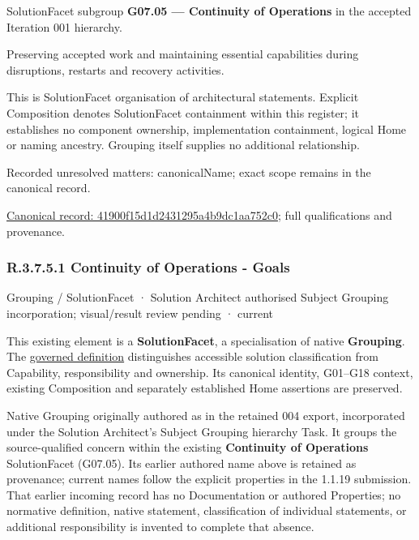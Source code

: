 SolutionFacet subgroup \textbf{G07.05 — Continuity of Operations} in the accepted Iteration 001 hierarchy.



Preserving accepted work and maintaining essential capabilities during disruptions, restarts and recovery activities.



This is SolutionFacet organisation of architectural statements. Explicit Composition denotes SolutionFacet containment within this register; it establishes no component ownership, implementation containment, logical Home or naming ancestry. Grouping itself supplies no additional relationship.


{\small Recorded unresolved matters: canonicalName; exact scope remains in the canonical record.}\par
{\footnotesize \href{../../../../../../../continuum/grouping/41900f15d1d2431295a4b9dc1aa752c0.md}{Canonical record: 41900f15d1d2431295a4b9dc1aa752c0}; full qualifications and provenance.}\par
\subsubsection*{R.3.7.5.1 Continuity of Operations - Goals}
\label{navigation:R.3.7.5.1}

\label{element:a4fbf334ea6e48028e39eb7f74ced2bb}
{\small Grouping / SolutionFacet · Solution Architect authorised Subject Grouping incorporation; visual/result review pending · current}\par

This existing element is a \textbf{SolutionFacet}, a specialisation of native
\textbf{Grouping}. The \href{\detokenize{../../../../../../../governance/continuum-representation.md#solutionfacet-classification--1119-candidate}}{governed definition}
distinguishes accessible solution classification from Capability, responsibility
and ownership. Its canonical identity, G01–G18 context, existing Composition
and separately established Home assertions are preserved.



Native Grouping originally authored as \texttt{} in the retained 004 export,
incorporated under the Solution Architect's Subject Grouping hierarchy Task.
It groups the source-qualified \texttt{} concern within
the existing \textbf{Continuity of Operations} SolutionFacet (G07.05). Its earlier authored name above is retained as provenance; current names
follow the explicit properties in the 1.1.19 submission.
That earlier incoming record has no Documentation or authored Properties; no normative
definition, native statement, classification of individual statements, or
additional responsibility is invented to complete that absence.



